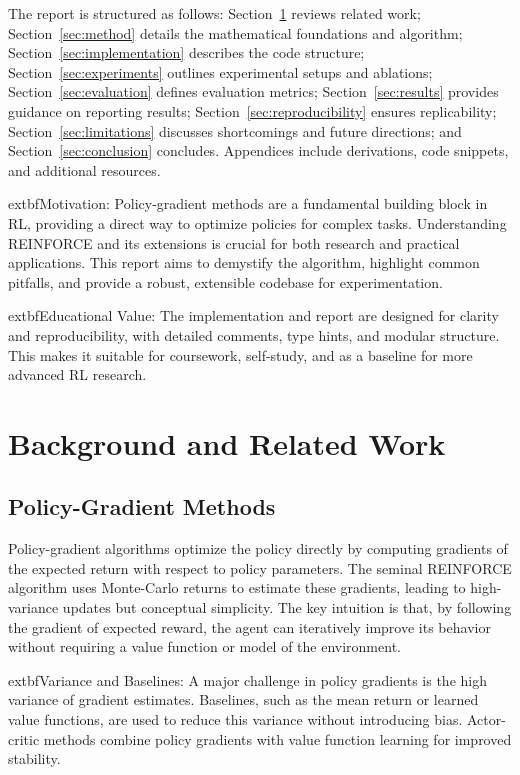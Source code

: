 \documentclass[conference]{IEEEtran}
\begin{document}
The report is structured as follows: Section~\ref{sec:background} reviews related work; Section~\ref{sec:method} details the mathematical foundations and algorithm; Section~\ref{sec:implementation} describes the code structure; Section~\ref{sec:experiments} outlines experimental setups and ablations; Section~\ref{sec:evaluation} defines evaluation metrics; Section~\ref{sec:results} provides guidance on reporting results; Section~\ref{sec:reproducibility} ensures replicability; Section~\ref{sec:limitations} discusses shortcomings and future directions; and Section~\ref{sec:conclusion} concludes. Appendices include derivations, code snippets, and additional resources.

	extbf{Motivation:} Policy-gradient methods are a fundamental building block in RL, providing a direct way to optimize policies for complex tasks. Understanding REINFORCE and its extensions is crucial for both research and practical applications. This report aims to demystify the algorithm, highlight common pitfalls, and provide a robust, extensible codebase for experimentation.

	extbf{Educational Value:} The implementation and report are designed for clarity and reproducibility, with detailed comments, type hints, and modular structure. This makes it suitable for coursework, self-study, and as a baseline for more advanced RL research.


\section{Background and Related Work}
\label{sec:background}


\subsection{Policy-Gradient Methods}

Policy-gradient algorithms optimize the policy directly by computing gradients of the expected return with respect to policy parameters. The seminal REINFORCE algorithm \cite{williams1992simple} uses Monte-Carlo returns to estimate these gradients, leading to high-variance updates but conceptual simplicity. The key intuition is that, by following the gradient of expected reward, the agent can iteratively improve its behavior without requiring a value function or model of the environment.

	extbf{Variance and Baselines:} A major challenge in policy gradients is the high variance of gradient estimates. Baselines, such as the mean return or learned value functions, are used to reduce this variance without introducing bias. Actor-critic methods \cite{konda2000actor} combine policy gradients with value function learning for improved stability.
\end{document}
